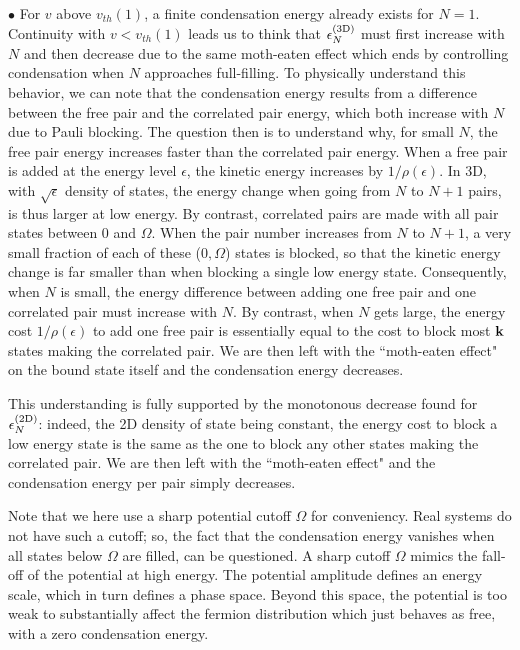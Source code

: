 \documentclass[5p,twocolumn]{elsarticle}
\begin{document}
$\bullet$  For $v$ above $v_{th}(1)$, a finite condensation energy already exists for $N=1$. Continuity with $v<v_{th}(1)$ leads us to think that $\epsilon^{{\text{(3D)}}}_N$ must first increase with $N$ and then decrease due to the same moth-eaten effect which ends by controlling condensation when $N$ approaches full-filling. 
To physically understand this behavior, we can note that the condensation energy results from a difference between the free pair and the correlated pair energy, which both increase with $N$ due to Pauli blocking.  The question then is to understand why, for small $N$, the free pair energy increases faster than the correlated pair energy. When a free pair is added at the energy level $\epsilon$, the kinetic energy increases by $1/\rho(\epsilon)$.  In 3D, with  $\sqrt{\epsilon}$ density of states, the energy change when going from $N$ to $N+1$ pairs, is thus larger at low energy. By contrast, correlated pairs are made with all pair states between $0$ and $\Omega$. When the pair number increases from $N$ to $N+1$, a very small fraction of each of these ($0,\Omega$) states is blocked, so that the kinetic energy change is far smaller than when blocking a single low energy state.  Consequently, when $N$ is small,  the energy difference between adding one free pair and one correlated pair must increase with $N$. By contrast, when $N$ gets large, the energy cost $1/\rho(\epsilon)$ to add one free pair is essentially equal to the cost to block most $\mathbf{k}$ states making the correlated pair.  We are then left with the ``moth-eaten effect" on the bound state itself and the condensation energy decreases. 

This understanding is fully supported by the monotonous decrease  found for $\epsilon^{{\text{(2D)}}}_N$: indeed, the 2D density of state being constant, the energy cost to block a low energy state is the same as the one to block  any other states making the correlated pair. We are then left with the ``moth-eaten effect" and the condensation energy per pair simply decreases.

Note that we here use a sharp potential cutoff $\Omega$ for conveniency.  Real systems do not have such a cutoff; so,   the fact that the condensation energy vanishes when all states below $\Omega$ are filled, can be questioned.  A sharp cutoff $\Omega$ mimics the fall-off of the potential at high energy.  The potential amplitude defines an energy scale, which in turn defines a phase space.  Beyond this space, the potential is too weak to substantially affect the fermion distribution which just behaves as free, with a zero condensation energy. 
\end{document}
